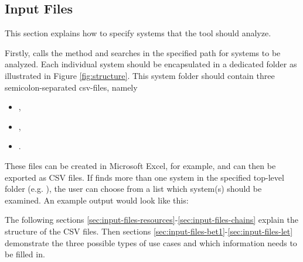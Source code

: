 \subsection{Input Files}
\label{sec:input-files}
This section explains how to specify systems that the tool \Tool should analyze.
\bigskip

Firstly, \Tool calls the method  and searches in the specified path for systems to be analyzed. 
Each individual system should be encapsulated in a dedicated folder as illustrated in Figure \ref{fig:structure}.
This system folder should contain three semicolon-separated csv-files, namely
\begin{itemize}[itemsep=0pt]
	\item {}, 
	\item {}, 
	\item {}. 
\end{itemize}
These files can be created in Microsoft Excel, for example, and can then be exported as CSV files.
If \Tool finds more than one system in the specified top-level folder (e.g. ), the user can choose from a list which system(s) should be examined. 
An example output would look like this:
\begin{tcolorbox}
\small
{}
\end{tcolorbox}

The following sections \ref{sec:input-files-resources}-\ref{sec:input-files-chains} explain the structure of the CSV files. 
Then sections \ref{sec:input-files-bet1}-\ref{sec:input-files-let} demonstrate the three possible types of use cases and which information needs to be filled in.


